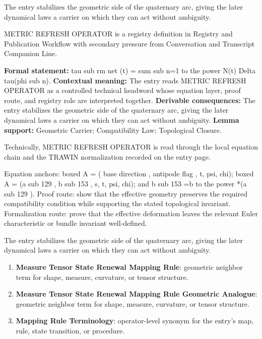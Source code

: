 The entry stabilizes the geometric side of the quaternary arc, giving the later dynamical laws a carrier on which they can act without ambiguity.
\clearpage


\begingroup\small
{}
METRIC REFRESH OPERATOR is a registry definition in Registry and Publication Workflow with secondary pressure from Conversation and Transcript Companion Line.

\begingroup\footnotesize\setlength{\emergencystretch}{3em}\sloppy
\textbf{Formal statement:} tau sub rm net (t) = sum sub n=1 to the power N(t) Delta tau(phi sub n). \textbf{Contextual meaning:} The entry reads METRIC REFRESH OPERATOR as a controlled technical headword whose equation layer, proof route, and registry role are interpreted together. \textbf{Derivable consequences:} The entry stabilizes the geometric side of the quaternary arc, giving the later dynamical laws a carrier on which they can act without ambiguity. \textbf{Lemma support:} Geometric Carrier; Compatibility Law; Topological Closure.\par
\endgroup

Technically, METRIC REFRESH OPERATOR is read through the local equation chain and the TRAWIN normalization recorded on the entry page.

Equation anchors: boxed A = ( base direction , antipode flag , t, psi, chi); boxed A = (a sub 129 , b sub 153 , s, t, psi, chi); and b sub 153 =b to the power *(a sub 129 ). Proof route: show that the effective geometry preserves the required compatibility condition while supporting the stated topological invariant. Formalization route: prove that the effective deformation leaves the relevant Euler characteristic or bundle invariant well-defined.

The entry stabilizes the geometric side of the quaternary arc, giving the later dynamical laws a carrier on which they can act without ambiguity.
\endgroup

\begin{enumerate}[leftmargin=1.6em,itemsep=6pt,topsep=4pt]
\item \textbf{Measure Tensor State Renewal Mapping Rule}: geometric neighbor term for shape, measure, curvature, or tensor structure.
\item \textbf{Measure Tensor State Renewal Mapping Rule Geometric Analogue}: geometric neighbor term for shape, measure, curvature, or tensor structure.
\item \textbf{Mapping Rule Terminology}: operator-level synonym for the entry's map, rule, state transition, or procedure.
\end{enumerate}

